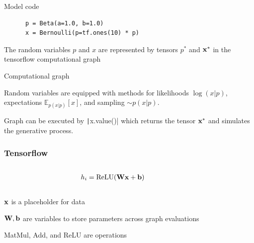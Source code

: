 \documentclass[10pt]{beamer}
\begin{document}
\begin{frame}[fragile]
  \begin{block}{Model code}
    \begin{verbatim}
      p = Beta(a=1.0, b=1.0)
      x = Bernoulli(p=tf.ones(10) * p)
    \end{verbatim}
  \end{block}
  The random variables $p$ and $x$ are represented by tensors $p^*$ and $\boldsymbol{\mathbf{x}}^*$ in the tensorflow computational graph
  \begin{block}{Computational graph}
    \begin{center}
      
    \end{center}
  \end{block}
  Random variables are equipped with methods for likelihoods $\log(x|p)$,
  expectations $\mathbb{E}_{p(x|p)}[x]$, and sampling $\sim p(x|p)$.

  Graph can be executed by \texttt|x.value()| which returns the tensor $\boldsymbol{\mathbf{x}}^*$ and simulates the
  generative process.
\end{frame}


\begin{frame}[fragile]
  \frametitle{Tensorflow}
  \begin{columns}
    \begin{column}{.6\textwidth}
      \begin{align*}
        h_i = \textnormal{ReLU}(\boldsymbol{\mathbf{W}} \boldsymbol{\mathbf{x}} + \boldsymbol{\mathbf{b}})
      \end{align*} \\
      $\boldsymbol{\mathbf{x}}$ is a placeholder for data
      \vspace{10pt}

      $\boldsymbol{\mathbf{W}}, \boldsymbol{\mathbf{b}}$ are variables to store parameters across graph evaluations
      \vspace{10pt}

      MatMul, Add, and ReLU are operations
    \end{column}
    \begin{column}{.4\textwidth}
      
    \end{column}
  \end{columns}
\end{frame}
\end{document}
